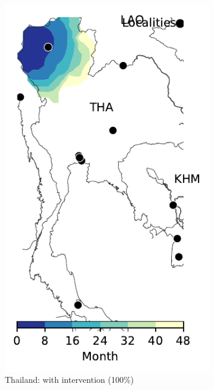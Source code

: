 \documentclass[10pt]{article}
\theoremstyle{definition}
\begin{document}
\begin{figure}[!ht]
\begin{subfigure}[b]{.28\textwidth}
\includegraphics[width=\textwidth]{../cellular_automata/results/contour/TH_model-B_precip1-out-100_m1_l3.pdf}
\caption{Thailand: with intervention (100\%)\label{fig:thaBContourInt}}
\end{subfigure}
\begin{subfigure}[b]{.28\textwidth}

\end{subfigure}
\end{figure}
\end{document}
